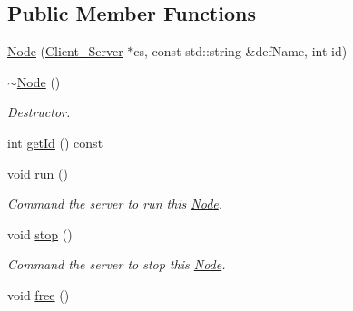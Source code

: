 \subsection*{Public Member Functions}
\begin{DoxyCompactItemize}
\item 
\hyperlink{classColliderPlusPlus_1_1Node_ab0bc89b38db96dea7086833453b8bf12}{Node} (\hyperlink{classColliderPlusPlus_1_1Client__Server}{Client\-\_\-\-Server} $\ast$cs, const std\-::string \&def\-Name, int id)
\item 
\hypertarget{classColliderPlusPlus_1_1Node_ae1198291ae5d81dd34474b7cf52438cd}{\hyperlink{classColliderPlusPlus_1_1Node_ae1198291ae5d81dd34474b7cf52438cd}{$\sim$\-Node} ()}\label{classColliderPlusPlus_1_1Node_ae1198291ae5d81dd34474b7cf52438cd}

\begin{DoxyCompactList}\small\item\em Destructor. \end{DoxyCompactList}\item 
int \hyperlink{classColliderPlusPlus_1_1Node_a8fe1785ce07ad46c422c7451f21a30fb}{get\-Id} () const 
\item 
\hypertarget{classColliderPlusPlus_1_1Node_aab0fa08436f6493b166067a7e761c36a}{void \hyperlink{classColliderPlusPlus_1_1Node_aab0fa08436f6493b166067a7e761c36a}{run} ()}\label{classColliderPlusPlus_1_1Node_aab0fa08436f6493b166067a7e761c36a}

\begin{DoxyCompactList}\small\item\em Command the server to run this \hyperlink{classColliderPlusPlus_1_1Node}{Node}. \end{DoxyCompactList}\item 
\hypertarget{classColliderPlusPlus_1_1Node_a44da500743469ad8a4729967d1d8e2b4}{void \hyperlink{classColliderPlusPlus_1_1Node_a44da500743469ad8a4729967d1d8e2b4}{stop} ()}\label{classColliderPlusPlus_1_1Node_a44da500743469ad8a4729967d1d8e2b4}

\begin{DoxyCompactList}\small\item\em Command the server to stop this \hyperlink{classColliderPlusPlus_1_1Node}{Node}. \end{DoxyCompactList}\item 
\hypertarget{classColliderPlusPlus_1_1Node_a858d838d243f84bbb56287a7d03bb893}{void \hyperlink{classColliderPlusPlus_1_1Node_a858d838d243f84bbb56287a7d03bb893}{free} ()}\label{classColliderPlusPlus_1_1Node_a858d838d243f84bbb56287a7d03bb893}


\end{DoxyCompactItemize}
